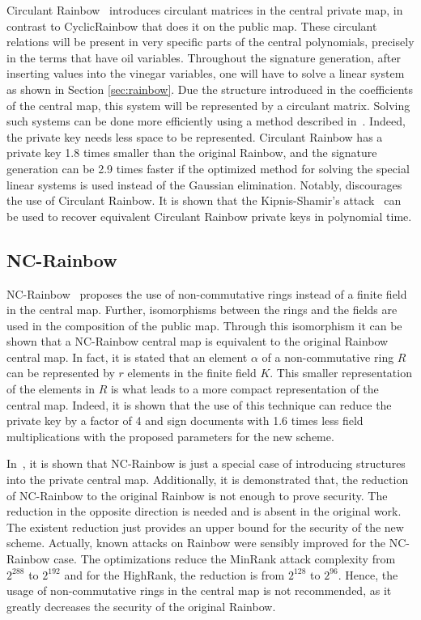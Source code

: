 \documentclass{ufsctex/ufsctex}
\begin{document}
Circulant Rainbow~\cite{peng2017circulant} introduces circulant matrices in the
central private map, in contrast to CyclicRainbow that does it on the public
map. These circulant relations will be present in very specific parts of the
central polynomials, precisely in the terms that have oil variables. Throughout
the signature generation, after inserting values into the vinegar variables,
one will have to solve a linear system as shown in Section \ref{sec:rainbow}.
Due the structure introduced in the coefficients of the central map, this
system will be represented by a circulant matrix. Solving such systems can be
done more efficiently using a method described in~\cite{peng2017circulant}.
Indeed, the private key needs less space to be represented. Circulant Rainbow
has a private key 1.8 times smaller than the original Rainbow, and the
signature generation can be 2.9 times faster if the optimized method for
solving the special linear systems is used instead of the Gaussian elimination.
Notably, \cite{hashimoto2018security} discourages the use of Circulant Rainbow.
It is shown that the Kipnis-Shamir's attack~\cite{kipnis1998cryptanalysis} can
be used to recover equivalent Circulant Rainbow private keys in polynomial
time.

\subsection{NC-Rainbow}

NC-Rainbow~\cite{yasuda2012reducing} proposes the use of non-commutative rings
instead of a finite field in the central map. Further, isomorphisms between the
rings and the fields are used in the composition of the public map. Through
this isomorphism it can be shown that a NC-Rainbow central map is equivalent to
the original Rainbow central map. In fact, it is stated that an element
$\alpha$ of a non-commutative ring $R$ can be represented by $r$ elements in
the finite field $K$. This smaller representation of the elements in $R$ is
what leads to a more compact representation of the central map. Indeed, it is
shown that the use of this technique can reduce the private key by a factor of
4 and sign documents with 1.6 times less field multiplications with the
proposed parameters for the new scheme.

In~\cite{thomae2012quo}, it is shown that NC-Rainbow is just a special case of
introducing structures into the private central map. Additionally, it is
demonstrated that, the reduction of NC-Rainbow to the original Rainbow is not
enough to prove security. The reduction in the opposite direction is needed and
is absent in the original work. The existent reduction just provides an upper
bound for the security of the new scheme. Actually, known attacks on Rainbow
were sensibly improved for the NC-Rainbow case. The optimizations reduce the
MinRank attack complexity from $2^{288}$ to $2^{192}$ and for the HighRank, the
reduction is from $2^{128}$ to $2^{96}$. Hence, the usage of non-commutative
rings in the central map is not recommended, as it greatly decreases the
security of the original Rainbow.
\end{document}
